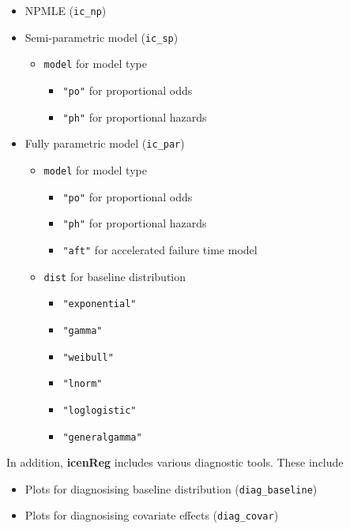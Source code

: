 \documentclass[a4paper]{article}
\begin{document}
  \begin{itemize}
  
    \item NPMLE (\texttt{ic\_np})
  
    \item Semi-parametric model (\texttt{ic\_sp})
        \begin{itemize}
        \item \texttt{model} for model type
          \begin{itemize}
          \item \texttt{"po"} for proportional odds
          \item \texttt{"ph"} for proportional hazards 
          \end{itemize}
        \end{itemize}
    \item Fully parametric model (\texttt{ic\_par})
      \begin{itemize}
        \item \texttt{model} for model type
          \begin{itemize}
          \item \texttt{"po"} for proportional odds
          \item \texttt{"ph"} for proportional hazards 
          \item \texttt{"aft"} for accelerated failure time model
          \end{itemize}

      \item \texttt{dist} for baseline distribution
        \begin{itemize}
        \item \texttt{"exponential"}
        \item \texttt{"gamma"} 
        \item \texttt{"weibull"}
        \item \texttt{"lnorm"}
        \item \texttt{"loglogistic"}
        \item \texttt{"generalgamma"}
        \end{itemize}
      \end{itemize}
  \end{itemize}
  
  In addition, {\bf{icenReg}} includes various diagnostic tools. These include
  
  \begin{itemize}
  
    \item Plots for diagnosising baseline distribution (\texttt{diag\_baseline})
    
    \item Plots for diagnosising covariate effects (\texttt{diag\_covar})
    

  \end{itemize}
  
\end{document}
